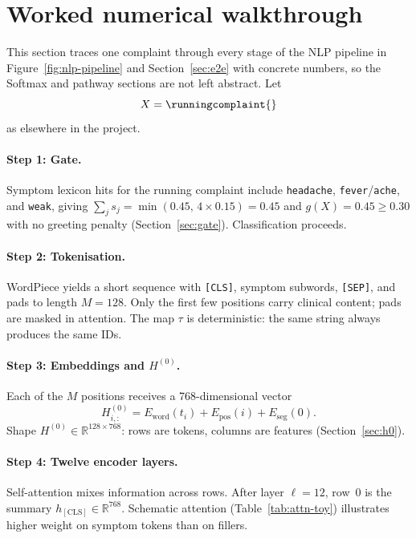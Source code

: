\section{Worked numerical walkthrough}
\label{sec:walkthrough}

This section traces one complaint through every stage of the NLP pipeline in Figure~\ref{fig:nlp-pipeline} and Section~\ref{sec:e2e} with concrete numbers, so the Softmax and pathway sections are not left abstract. Let
\[
  X = \text{\runningcomplaint{}}
\]
as elsewhere in the project.

\paragraph{Step 1: Gate.}
Symptom lexicon hits for the running complaint include \texttt{headache}, \texttt{fever}/\texttt{ache}, and \texttt{weak}, giving \(\sum_j s_j=\min(0.45,\,4\times 0.15)=0.45\) and \(g(X)=0.45\geq 0.30\) with no greeting penalty (Section~\ref{sec:gate}). Classification proceeds.

\paragraph{Step 2: Tokenisation.}
WordPiece yields a short sequence with \texttt{[CLS]}, symptom subwords, \texttt{[SEP]}, and pads to length \(M=128\). Only the first few positions carry clinical content; pads are masked in attention. The map \(\tau\) is deterministic: the same string always produces the same IDs.

\paragraph{Step 3: Embeddings and \(H^{(0)}\).}
Each of the \(M\) positions receives a 768-dimensional vector
\[
  H^{(0)}_{i,:} = E_{\mathrm{word}}(t_i) + E_{\mathrm{pos}}(i) + E_{\mathrm{seg}}(0).
\]
Shape \(H^{(0)}\in\mathbb{R}^{128\times 768}\): rows are tokens, columns are features (Section~\ref{sec:h0}).

\paragraph{Step 4: Twelve encoder layers.}
Self-attention mixes information across rows. After layer \(\ell=12\), row~0 is the summary \(h_{\mathrm{[CLS]}}\in\mathbb{R}^{768}\). Schematic attention (Table~\ref{tab:attn-toy}) illustrates higher weight on symptom tokens than on fillers.

